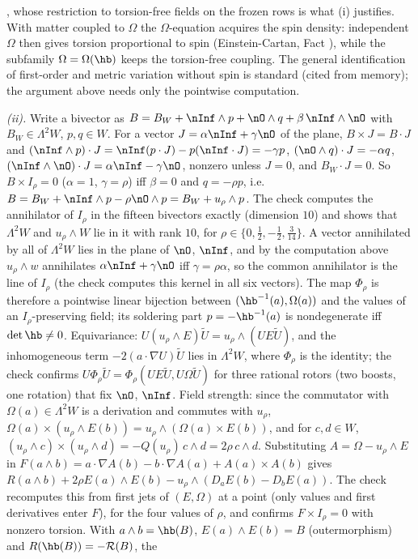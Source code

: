 , whose restriction to torsion-free fields on the frozen rows is what (i) justifies. With matter coupled to $\Omega$ the $\Omega$-equation acquires the spin density: independent $\Omega$ then gives torsion proportional to spin (Einstein-Cartan, Fact ), while the subfamily $\Omega = \Omega(\hb)$ keeps the torsion-free coupling. The general identification of first-order and metric variation without spin is standard (cited from memory); the argument above needs only the pointwise computation.

\emph{(ii).} Write a bivector as $B = B_{W} + \nInf \wedge p + \nO \wedge q + \beta\,\nInf \wedge \nO$ with $B_{W} \in \Lambda^{2}W$, $p, q \in W$. For a vector $J = \alpha\nInf + \gamma\nO$ of the plane, $B \times J = B \cdot J$ and $(\nInf \wedge p) \cdot J = \nInf (p \cdot J) - p(\nInf \cdot J) = -\gamma p$, $(\nO \wedge q) \cdot J = -\alpha q$, $(\nInf \wedge \nO) \cdot J = \alpha\nInf - \gamma\nO$, nonzero unless $J = 0$, and $B_{W} \cdot J = 0$. So $B \times I_{\rho} = 0$ ($\alpha = 1$, $\gamma = \rho$) iff $\beta = 0$ and $q = -\rho p$, i.e. $B = B_{W} + \nInf \wedge p - \rho\nO \wedge p = B_{W} + u_{\rho} \wedge p$. The check computes the annihilator of $I_{\rho}$ in the fifteen bivectors exactly (dimension $10$) and shows that $\Lambda^{2}W$ and $u_{\rho} \wedge W$ lie in it with rank $10$, for $\rho \in \{0, \tfrac12, -\tfrac12, \tfrac{3}{14}\}$. A vector annihilated by all of $\Lambda^{2}W$ lies in the plane of $\nO$, $\nInf$, and by the computation above $u_{\rho} \wedge w$ annihilates $\alpha\nInf + \gamma\nO$ iff $\gamma = \rho\alpha$, so the common annihilator is the line of $I_{\rho}$ (the check computes this kernel in all six vectors). The map $\Phi_{\rho}$ is therefore a pointwise linear bijection between $(\hb^{-1}(a), \Omega(a))$ and the values of an $I_{\rho}$-preserving field; its soldering part $p = -\hb^{-1}(a)$ is nondegenerate iff $\det\hb \neq 0$. Equivariance: $U(u_{\rho} \wedge E)\tilde{U} = u_{\rho} \wedge (UE\tilde{U})$, and the inhomogeneous term $-2(a \cdot \nabla U)\tilde{U}$ lies in $\Lambda^{2}W$, where $\Phi_{\rho}$ is the identity; the check confirms $U\Phi_{\rho}\tilde{U} = \Phi_{\rho}(UE\tilde{U}, U\Omega\tilde{U})$ for three rational rotors (two boosts, one rotation) that fix $\nO$, $\nInf$. Field strength: since the commutator with $\Omega(a) \in \Lambda^{2}W$ is a derivation and commutes with $u_{\rho}$, $\Omega(a) \times (u_{\rho} \wedge E(b)) = u_{\rho} \wedge (\Omega(a) \times E(b))$, and for $c, d \in W$, $(u_{\rho} \wedge c) \times (u_{\rho} \wedge d) = -Q(u_{\rho})\,c \wedge d = 2\rho\, c \wedge d$. Substituting $A = \Omega - u_{\rho} \wedge E$ in $F(a \wedge b) = a \cdot \nabla A(b) - b \cdot \nabla A(a) + A(a) \times A(b)$ gives $R(a \wedge b) + 2\rho E(a) \wedge E(b) - u_{\rho} \wedge (D_{a}E(b) - D_{b}E(a))$. The check recomputes this from first jets of $(E, \Omega)$ at a point (only values and first derivatives enter $F$), for the four values of $\rho$, and confirms $F \times I_{\rho} = 0$ with nonzero torsion. With $a \wedge b = \hb(B)$, $E(a) \wedge E(b) = B$ (outermorphism) and $R(\hb(B)) = -\mathcal{R}(B)$, the 